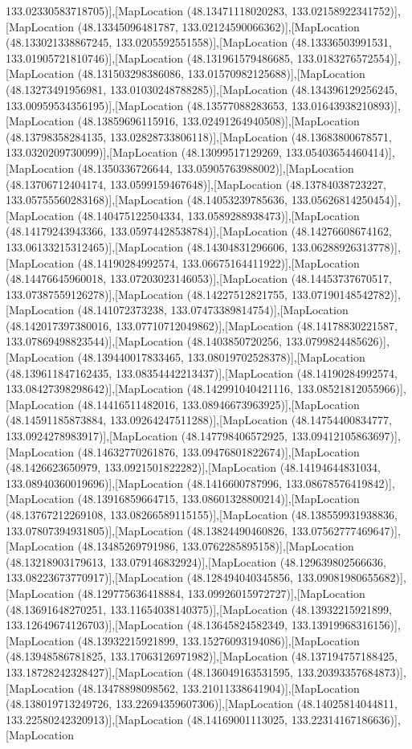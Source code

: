 133.02330583718705)],[MapLocation (48.13471118020283, 133.02158922341752)],[MapLocation (48.13345096481787, 133.02124590066362)],[MapLocation (48.133021338867245, 133.0205592551558)],[MapLocation (48.13336503991531, 133.01905721810746)],[MapLocation (48.131961579486685, 133.0183276572554)],[MapLocation (48.131503298386086, 133.01570982125688)],[MapLocation (48.13273491956981, 133.01030248788285)],[MapLocation (48.134396129256245, 133.00959534356195)],[MapLocation (48.13577088283653, 133.01643938210893)],[MapLocation (48.13859696115916, 133.02491264940508)],[MapLocation (48.13798358284135, 133.02828733806118)],[MapLocation (48.13683800678571, 133.0320209730099)],[MapLocation (48.13099517129269, 133.05403654460414)],[MapLocation (48.1350336726644, 133.05905763988002)],[MapLocation (48.13706712404174, 133.0599159467648)],[MapLocation (48.13784038723227, 133.05755560283168)],[MapLocation (48.14053239785636, 133.05626814250454)],[MapLocation (48.140475122504334, 133.0589288938473)],[MapLocation (48.14179243943366, 133.05974428538784)],[MapLocation (48.14276608674162, 133.06133215312465)],[MapLocation (48.14304831296606, 133.06288926313778)],[MapLocation (48.14190284992574, 133.06675164411922)],[MapLocation (48.14476645960018, 133.07203023146053)],[MapLocation (48.14453737670517, 133.07387559126278)],[MapLocation (48.14227512821755, 133.07190148542782)],[MapLocation (48.141072373238, 133.07473389814754)],[MapLocation (48.142017397380016, 133.07710712049862)],[MapLocation (48.14178830221587, 133.07869498823544)],[MapLocation (48.1403850720256, 133.0799824485626)],[MapLocation (48.139440017833465, 133.08019702528378)],[MapLocation (48.139611847162435, 133.08354442213437)],[MapLocation (48.14190284992574, 133.08427398298642)],[MapLocation (48.142991040421116, 133.08521812055966)],[MapLocation (48.14416511482016, 133.08946673963925)],[MapLocation (48.14591185873884, 133.09264247511288)],[MapLocation (48.14754400834777, 133.0924278983917)],[MapLocation (48.147798406572925, 133.09412105863697)],[MapLocation (48.14632770261876, 133.09476801822674)],[MapLocation (48.1426623650979, 133.0921501822282)],[MapLocation (48.14194644831034, 133.08940360019696)],[MapLocation (48.1416600787996, 133.08678576419842)],[MapLocation (48.13916859664715, 133.08601328800214)],[MapLocation (48.13767212269108, 133.08266589115155)],[MapLocation (48.138559931938836, 133.07807394931805)],[MapLocation (48.13824490460826, 133.07562777469647)],[MapLocation (48.13485269791986, 133.0762285895158)],[MapLocation (48.13218903179613, 133.079146832924)],[MapLocation (48.129639802566636, 133.08223673770917)],[MapLocation (48.128494040345856, 133.09081980655682)],[MapLocation (48.129775636418884, 133.09926015972727)],[MapLocation (48.13691648270251, 133.11654038140375)],[MapLocation (48.13932215921899, 133.12649674126703)],[MapLocation (48.13645824582349, 133.13919968316156)],[MapLocation (48.13932215921899, 133.15276093194086)],[MapLocation (48.13948586781825, 133.17063126971982)],[MapLocation (48.137194757188425, 133.18728242328427)],[MapLocation (48.136049163531595, 133.20393357684873)],[MapLocation (48.13478898098562, 133.21011338641904)],[MapLocation (48.138019713249726, 133.22694359607306)],[MapLocation (48.14025814044811, 133.22580242320913)],[MapLocation (48.14169001113025, 133.22314167186636)],[MapLocation 